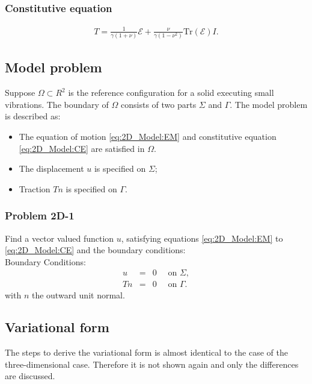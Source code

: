 \documentclass[../../main.tex]{subfiles}
\begin{document}
\subsubsection{Constitutive equation}\label{sssec:2D_Model:ConstitutiveEquation}
\begin{eqnarray}
	T = \frac{1}{\gamma(1+\nu)}\mathcal{E} + \frac{\nu}{\gamma(1-\nu^2)}\textrm{Tr}(\mathcal{E}) I. \label{eq:2D_Model:CE}
\end{eqnarray}

\subsection{Model problem}\label{ssec:2D_Model:ModelProblem}
Suppose $\Omega \subset R^2$ is the reference configuration for a solid executing small vibrations. The boundary of $\Omega$ consists of two parts $\Sigma$ and $\Gamma$. The model problem is described as:
\begin{itemize}
    \item[] The equation of motion \eqref{eq:2D_Model:EM} and constitutive equation \eqref{eq:2D_Model:CE} are satisfied in $\Omega$.
	\item[] The displacement $u$ is specified on $\Sigma$;
	\item[] Traction $Tn$ is specified on $\Gamma$.
\end{itemize}

\subsubsection{Problem 2D-1}\label{sssec:2D_Model:Problem2D1}
Find a vector valued function $u$, satisfying equations \eqref{eq:2D_Model:EM} to \eqref{eq:2D_Model:CE} and the boundary conditions:\\

Boundary Conditions:\\
\begin{eqnarray*}
	u & = & 0 \quad \textrm{ on } \Sigma,\\
	Tn & = & 0 \quad \textrm{ on } \Gamma.
\end{eqnarray*} with $n$ the outward unit normal.

\subsection{Variational form}\label{ssec:2D_Model:VariationalForm}
The steps to derive the variational form is almost identical to the case of the three-dimensional case. Therefore it is not shown again and only the differences are discussed. \\
\end{document}
